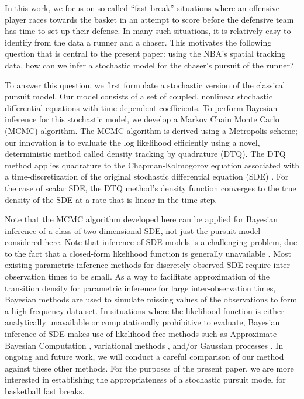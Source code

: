 \documentclass[graybox]{svmult}
\begin{document}
In this work, we focus on so-called ``fast break'' situations where an
offensive player races towards the basket in an attempt to score before the
defensive team has time to set up their defense.  In many such situations,
it is relatively easy to identify from the data a runner and a
chaser.  This motivates the following question that is central to the
present paper: using the NBA's spatial tracking data, how can we infer
a stochastic model for the chaser's pursuit of the runner?

To answer this question, we first formulate a stochastic version of
the classical pursuit model.  Our model consists of a set of coupled,
nonlinear stochastic differential equations with time-dependent
coefficients.  To perform Bayesian inference for this stochastic
model, we develop a Markov Chain Monte Carlo (MCMC) algorithm.  The
MCMC algorithm is derived using a Metropolis scheme; our innovation is
to evaluate the log likelihood efficiently using a novel, deterministic
method called density tracking by quadrature (DTQ).  The DTQ method
applies quadrature to the Chapman-Kolmogorov equation associated with
a time-discretization of the original stochastic differential equation
(SDE) \cite{BhatMadu2016}. For the case of scalar SDE, the DTQ
method's density function converges to the true density of the SDE at
a rate that is linear in the time step.

Note that the MCMC algorithm developed here can be applied for
Bayesian inference of a class of two-dimensional SDE, not just the pursuit model
considered here.  Note that inference of SDE models is a 
challenging problem, due to the fact that a closed-form likelihood
function is generally unavailable \cite{sorensen2004parametric,
  iacus2009simulation, fuchs2013inference}. Most existing parametric
inference methods for discretely observed SDE require
inter-observation times to be small.  As a way to facilitate
approximation of the transition density for parametric inference for
large inter-observation times, Bayesian methods are used to simulate
missing values of the observations to form a high-frequency data
set. In situations where the likelihood function is either
analytically unavailable or computationally prohibitive to evaluate,
Bayesian inference of SDE makes use of likelihood-free methods such as
Approximate Bayesian Computation \cite{Picchini2014}, variational
methods \cite{Archambeau2007a, Vrettas2015}, and/or Gaussian processes
\cite{Archambeau2007, Ruttor2013}.  In ongoing and future work, we
will conduct a careful comparison of our method against these other
methods.  For the purposes of the present paper, we are more
interested in establishing the appropriateness of a stochastic pursuit
model for basketball fast breaks.
\end{document}
